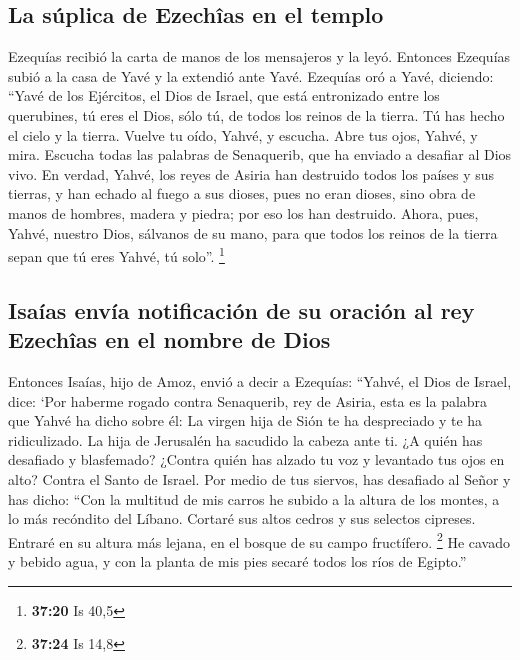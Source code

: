 \begin{paracol}{2}
\hypertarget{la-suxfaplica-de-ezechuxeeas-en-el-templo}{%
\subsection{La súplica de Ezechîas en el
templo}\label{la-suxfaplica-de-ezechuxeeas-en-el-templo}}

 Ezequías recibió la carta de manos de los mensajeros y
la leyó. Entonces Ezequías subió a la casa de Yavé y la extendió ante
Yavé.  Ezequías oró a Yavé, diciendo: 
``Yavé de los Ejércitos, el Dios de Israel, que está entronizado entre
los querubines, tú eres el Dios, sólo tú, de todos los reinos de la
tierra. Tú has hecho el cielo y la tierra.  Vuelve tu
oído, Yahvé, y escucha. Abre tus ojos, Yahvé, y mira. Escucha todas las
palabras de Senaquerib, que ha enviado a desafiar al Dios vivo.
 En verdad, Yahvé, los reyes de Asiria han destruido
todos los países y sus tierras,  y han echado al fuego a
sus dioses, pues no eran dioses, sino obra de manos de hombres, madera y
piedra; por eso los han destruido.  Ahora, pues, Yahvé,
nuestro Dios, sálvanos de su mano, para que todos los reinos de la
tierra sepan que tú eres Yahvé, tú solo''. \footnote{\textbf{37:20} Is
  40,5}

\hypertarget{isauxedas-envuxeda-notificaciuxf3n-de-su-oraciuxf3n-al-rey-ezechuxeeas-en-el-nombre-de-dios}{%
\subsection{Isaías envía notificación de su oración al rey Ezechîas en
el nombre de
Dios}\label{isauxedas-envuxeda-notificaciuxf3n-de-su-oraciuxf3n-al-rey-ezechuxeeas-en-el-nombre-de-dios}}

 Entonces Isaías, hijo de Amoz, envió a decir a Ezequías:
``Yahvé, el Dios de Israel, dice: `Por haberme rogado contra Senaquerib,
rey de Asiria,  esta es la palabra que Yahvé ha dicho
sobre él: La virgen hija de Sión te ha despreciado y te ha ridiculizado.
La hija de Jerusalén ha sacudido la cabeza ante ti.  ¿A
quién has desafiado y blasfemado? ¿Contra quién has alzado tu voz y
levantado tus ojos en alto? Contra el Santo de Israel. 
Por medio de tus siervos, has desafiado al Señor y has dicho: ``Con la
multitud de mis carros he subido a la altura de los montes, a lo más
recóndito del Líbano. Cortaré sus altos cedros y sus selectos cipreses.
Entraré en su altura más lejana, en el bosque de su campo fructífero.
\footnote{\textbf{37:24} Is 14,8}  He cavado y bebido
agua, y con la planta de mis pies secaré todos los ríos de Egipto.''


\end{paracol}
